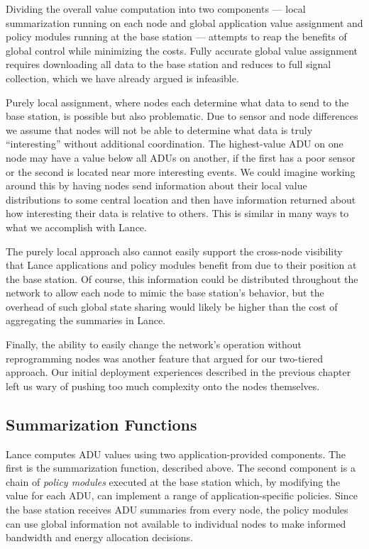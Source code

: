 Dividing the overall value computation into two components --- local
summarization running on each node and global application value assignment
and policy modules running at the base station --- attempts to reap the
benefits of global control while minimizing the costs. Fully accurate global
value assignment requires downloading all data to the base station and
reduces to full signal collection, which we have already argued is
infeasible.

Purely local assignment, where nodes each determine what data to send to the
base station, is possible but also problematic. Due to sensor and node
differences we assume that nodes will not be able to determine what data is
truly ``interesting'' without additional coordination. The highest-value ADU
on one node may have a value below all ADUs on another, if the first has a
poor sensor or the second is located near more interesting events. We could
imagine working around this by having nodes send information about their
local value distributions to some central location and then have information
returned about how interesting their data is relative to others. This is
similar in many ways to what we accomplish with Lance.

The purely local approach also cannot easily support the cross-node
visibility that Lance applications and policy modules benefit from due to
their position at the base station. Of course, this information could be
distributed throughout the network to allow each node to mimic the base
station's behavior, but the overhead of such global state sharing would
likely be higher than the cost of aggregating the summaries in Lance.

Finally, the ability to easily change the network's operation without
reprogramming nodes was another feature that argued for our two-tiered
approach. Our initial deployment experiences described in the previous
chapter left us wary of pushing too much complexity onto the nodes
themselves.

\subsection{Summarization Functions}

Lance computes ADU values using two application-provided components. The
first is the summarization function, described above. The second component is
a chain of \textit{policy modules} executed at the base station which, by
modifying the value for each ADU, can implement a range of
application-specific policies. Since the base station receives ADU summaries
from every node, the policy modules can use global information not available
to individual nodes to make informed bandwidth and energy allocation
decisions.

